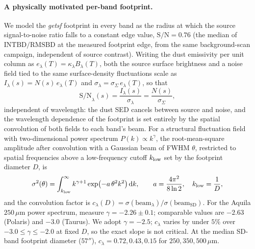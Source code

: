 \documentclass[11pt,a4paper]{article}
\begin{document}
\paragraph{A physically motivated per-band footprint.} We model the
\emph{getsf} footprint in every band as the radius at which the source
signal-to-noise ratio falls to a constant edge value, $\mathrm{S/N}=0.76$
(the median of $\mathrm{INTBD}/\mathrm{RMSBD}$ at the measured footprint edge,
from the same background-scan campaign, independent of source contrast).
Writing the dust emissivity per unit column as
$e_\lambda(T)=\kappa_\lambda B_\lambda(T)$, both the source surface brightness
and a noise field tied to the same surface-density fluctuations scale as
$I_\lambda(s)=N(s)\,e_\lambda(T)$ and $\sigma_\lambda=\sigma_\Sigma\,e_\lambda(T)$,
so that
\begin{equation}
  \mathrm{S/N}_\lambda(s) = \frac{I_\lambda(s)}{\sigma_\lambda}
    = \frac{N(s)}{\sigma_\Sigma},
  \label{eq:sncancel}
\end{equation}
independent of wavelength: the dust SED cancels between source and noise, and
the wavelength dependence of the footprint is set entirely by the spatial
convolution of both fields to each band's beam. For a structural fluctuation
field with two-dimensional power spectrum $P(k)\propto k^{\gamma}$, the
root-mean-square amplitude after convolution with a Gaussian beam of FWHM
$\theta$, restricted to spatial frequencies above a low-frequency cutoff
$k_{\rm low}$ set by the footprint diameter $D$, is
\begin{equation}
  \sigma^2(\theta) = \int_{k_{\rm low}}^{\infty}
    k^{\gamma+1}\exp\!\left(-a\,\theta^2 k^2\right)\mathrm{d}k,
  \qquad a=\frac{4\pi^2}{8\ln 2},\quad k_{\rm low}=\frac{1}{D},
  \label{eq:powerspec}
\end{equation}
and the convolution factor is $c_\lambda(D)=\sigma(\mathrm{beam}_\lambda)/
\sigma(\mathrm{beam}_{\mathrm{SD}})$. For the Aquila $250\,\mu$m power
spectrum, \citet{Roy2019} measure $\gamma=-2.26\pm0.1$; comparable values are
$-2.63$ (Polaris) and $-3.0$ (Taurus). We adopt $\gamma=-2.5$; $c_\lambda$
varies by under $5\%$ over $-3.0\le\gamma\le-2.0$ at fixed $D$, so the exact
slope is not critical. At the median SD-band footprint diameter ($57''$),
$c_\lambda = 0.72, 0.43, 0.15$ for $250, 350, 500\,\mu$m.
\end{document}

